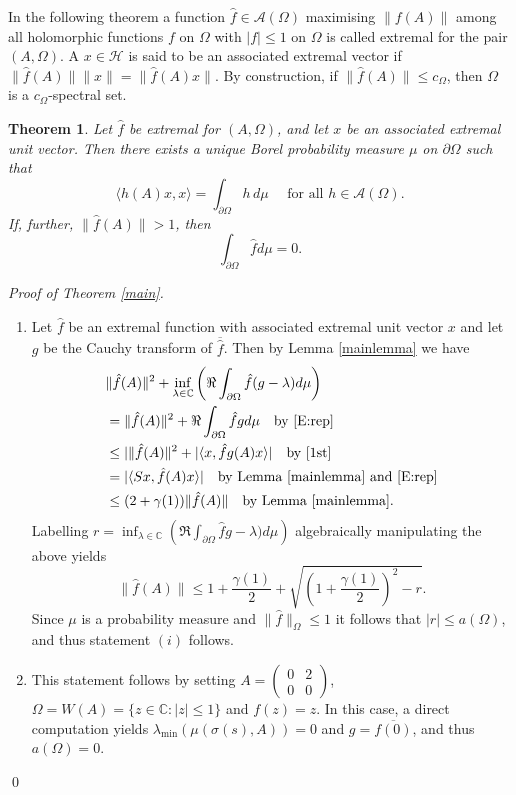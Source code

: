 \documentclass{article}
\newtheorem{Theorem}{Theorem}[section]
\begin{document}
In the following theorem a function $\hat{f} \in \mathcal{A}(\Omega)$ maximising $\|f(A)\|$ among all holomorphic functions $f$ on $ \Omega$ with $|f| \leq 1$ on $ \Omega$ is called extremal for the pair $(A, \Omega)$. A $x \in \mathcal{H}$ is said to be an associated extremal vector if $\|\hat{f}(A)\|\|x\| = \|\hat{f}(A)x\|$. By construction, if $\|\hat{f}(A)\| \leq c_\Omega$, then $\Omega$ is a $c_{\Omega}$-spectral set.

\begin{Theorem}\label{orthogthm} Let $\hat{f}$ be extremal for $(A,\Omega)$, and let $x$ be an associated extremal unit vector.
Then there exists a unique Borel probability measure $\mu$ on $\partial\Omega$ such that
\begin{equation}\label{1st}
\langle h(A)x,x\rangle=\int_{\partial\Omega} h\,d\mu \quad \text{ for all } h\in \mathcal{A}(\Omega).
\end{equation}
If, further, $\|\hat{f}(A)\| > 1$, then \begin{equation}\label{E:rep}
    \int_{\partial \Omega} \hat{f} d\mu = 0.
\end{equation}
\end{Theorem}


\noindent \textit{Proof of Theorem \ref{main}.}
    \begin{enumerate}
        \item Let $\hat{f}$ be an extremal function with associated extremal unit vector $x$ and let $g$ be the Cauchy transform of $\overline{\hat{f}}$. Then by Lemma \ref{mainlemma} we have 
\begin{align}
    & \|\hat{f}(A)\|^2 + \inf_{\lambda \in \mathbb{C}} \left(\Re \int_{\partial\Omega}\hat{f}(g- \lambda) d \mu \right)  \\
    & = \|\hat{f}(A)\|^2 + \Re \int_{\partial\Omega}\hat{f}g d \mu \quad \text{by \eqref{E:rep}} \\
    &\leq |\|\hat{f}(A)\|^2 + |\langle x, \hat{f}g(A)x \rangle| \quad \text{by \eqref{1st}}\\
    &=|\langle Sx,\hat{f}(A)x \rangle| \quad \text{by Lemma \ref{mainlemma} and \eqref{E:rep}} \\
    &\leq (2 + \gamma(1)) \|\hat{f}(A)\| \quad \text{by Lemma \ref{mainlemma}}.
\end{align}
Labelling $r  = \inf_
{\lambda \in \mathbb{C}} \left(\Re \int_{\partial\Omega}\hat{f}g- \lambda) d \mu \right)$ algebraically manipulating the above yields $$\|\hat{f}(A)\| \leq  1 + \frac{\gamma(1)}{2} + \sqrt{\left(1+ \frac{\gamma(1)}{2}\right)^2 - r}.$$
Since $\mu $ is a probability measure and $\|\hat{f}\|_{\Omega} \leq 1$ it follows that $|r| \leq a(\Omega)$, and thus statement $(i)$ follows. 
\item This statement follows by setting $A = \begin{pmatrix}
    0 & 2 \\
    0 & 0
\end{pmatrix}$, $ \Omega = W(A) = \{z \in \mathbb{C} :  |z| \leq 1 \}$ and $f(z) = z$. In this case, a direct computation yields $\lambda_{\min} ( \mu ( \sigma (s) , A )) = 0$ and $g = \overline{f(0)}$, and thus $a(\Omega) = 0$. 
\end{enumerate}
\qed
\end{document}
